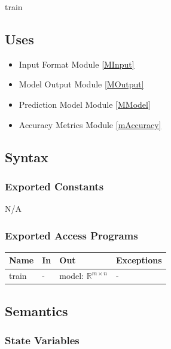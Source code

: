 \documentclass[12pt, titlepage]{article}
\begin{document}
train

\subsection{Uses}

\begin{itemize}
  \item Input Format Module \ref{MInput}
  \item Model Output Module \ref{MOutput}
  \item Prediction Model Module \ref{MModel}
  \item Accuracy Metrics Module \ref{mAccuracy}
\end{itemize}

\subsection{Syntax}

\subsubsection{Exported Constants}

N/A

\subsubsection{Exported Access Programs}

\begin{center}
\begin{tabular}{p{2cm} p{4cm} p{4cm} p{2cm}}
\hline
\textbf{Name} & \textbf{In} & \textbf{Out} & \textbf{Exceptions} \\
\hline
train & - & model: $\mathbb{R}^{m \times n}$ & - \\
\hline
\end{tabular}
\end{center}

\subsection{Semantics}

\subsubsection{State Variables}
\end{document}
